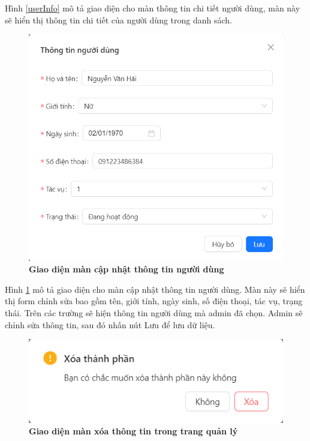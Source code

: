Hình \ref{userInfo} mô tả giao diện cho màn thông tin chi tiết người dùng, màn này sẽ hiển thị thông tin
chi tiết của người dùng trong danh sách.

\begin{figure}[H]
  \centering
  \includegraphics[scale=0.7]{Images/server/webUI/updateUser.png}
  \caption[Giao diện màn cập nhật thông tin người dùng]{\bfseries \fontsize{12pt}{0pt}\selectfont Giao diện màn cập nhật thông tin người dùng}
  \label{editUser} %
\end{figure}

Hình \ref{editUser} mô tả giao diện cho màn cập nhật thông tin người dùng. Màn này sẽ hiển thị form chỉnh sửa bao gồm 
tên, giới tính, ngày sinh, số điện thoại, tác vụ, trạng thái. Trên các trường sẽ hiện thông tin người dùng mà admin đã chọn. 
Admin sẽ chỉnh sửa thông tin, sau đó nhấn nút Lưu để lưu dữ liệu.

\begin{figure}[H]
  \centering
  \includegraphics[scale=0.7]{Images/server/webUI/delete.png}
  \caption[Giao diện màn xóa thông tin trong trang quản lý]{\bfseries \fontsize{12pt}{0pt}\selectfont Giao diện màn xóa thông tin trong trang quản lý}
  \label{delete} %
\end{figure}

